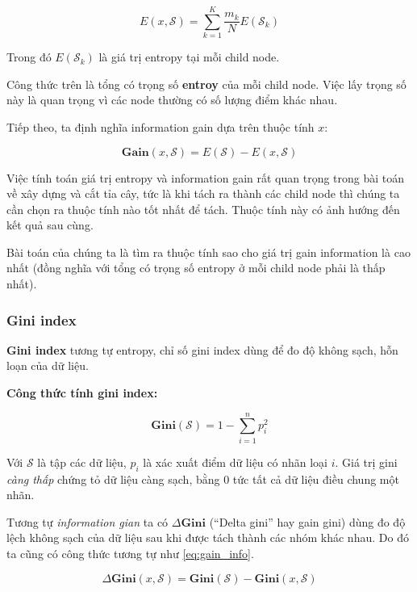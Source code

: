 \documentclass[../main-report.tex]{subfiles}
\begin{document}
\begin{equation}
E(x, \mathcal{S}) = \sum_{k=1}^K \frac{m_k}{N} E(\mathcal{S}_k)
\end{equation}

Trong đó $E(\mathcal{S}_k)$ là giá trị entropy tại mỗi child node.

Công thức trên là tổng có trọng số \textbf{entroy} của mỗi child node. Việc lấy trọng số này là quan trọng vì các node thường có số lượng điểm khác nhau.

Tiếp theo, ta định nghĩa information gain dựa trên thuộc tính \(x\):

\begin{equation} \label{eq:gain_info}
\mathbf{Gain}(x, \mathcal{S}) = E(\mathcal{S}) - E(x, \mathcal{S})
\end{equation}

Việc tính toán giá trị entropy và information gain rất quan trọng trong bài toán về xây dựng và cắt tỉa cây, tức là khi tách ra thành các child node thì chúng ta cần chọn ra thuộc tính nào tốt nhất để tách. Thuộc tính này có ảnh hướng đến kết quả sau cùng.

Bài toán của chúng ta là tìm ra thuộc tính sao cho giá trị gain information là cao nhất (đồng nghĩa với tổng có trọng số entropy ở mỗi child node phải là thấp nhất).

\subsubsection{Gini index}
\textbf{Gini index} tương tự entropy, chỉ số gini index dùng để đo độ không sạch, hỗn loạn của dữ liệu.

\textbf{Công thức tính gini index:}

\begin{equation}
\mathbf{Gini}(\mathcal{S}) = 1 - \sum_{i=1}^n p^{2}_{i}
\end{equation}

Với $\mathcal{S}$ là  tập các dữ liệu, $p_i$ là xác xuất điểm dữ liệu có nhãn loại $i$. Giá trị gini \emph{càng thấp} chứng tỏ dữ liệu càng sạch, bằng 0 tức tất cả dữ liệu điều chung một nhãn.

Tương tự \emph{information gian} ta có $\Delta\mathbf{Gini}$ (``Delta gini'' hay gain gini) dùng đo độ lệch không sạch của dữ liệu sau khi được tách thành các nhóm khác nhau. Do đó ta cũng có công thức tương tự như \ref{eq:gain_info}.

\begin{equation}
\Delta\mathbf{Gini}(x, \mathcal{S}) = \mathbf{Gini}(\mathcal{S}) - \mathbf{Gini}(x, \mathcal{S})
\end{equation}
\end{document}
